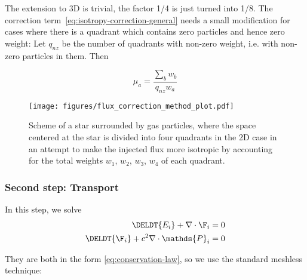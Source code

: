 The extension to 3D is trivial, the factor 1/4 is just turned into 1/8. The
correction term~\ref{eq:isotropy-correction-general} needs a small modification
for cases where there is a quadrant which contains zero particles and hence
zero weight: Let $q_{nz}$ be the number of quadrants with non-zero weight, i.e.
with non-zero particles in them. Then

\begin{equation}
	\mu_a = \frac{\sum_b w_b}{q_{nz} w_a} \label{eq:isotropy-correction-with-zero}
\end{equation}


\begin{figure}
	\centering
	\texttt{[image: figures/flux\_correction\_method\_plot.pdf]}%
	\label{fig:flux-injection-correction-method}
	\caption{
		Scheme of a star surrounded by gas particles, where the space centered at the
        star is divided into four quadrants in the 2D case in an attempt to make the
        injected flux more isotropic by accounting for the total weights $w_1$, $w_2$,
        $w_3$, $w_4$ of each quadrant.
	}
\end{figure}
























\subsubsection{Second step: Transport}\label{chap:transport-step}

In this step, we solve
\begin{align}
		\DELDT{E_i} + \nabla \cdot \F_i &= 0 \label{eq:homogenized-dEdt}\\
		\DELDT{\F_i} + c^2 \nabla \cdot \mathds{P}_i &= 0 \label{eq:homogenized-dFdt}
\end{align}

They are both in the form \ref{eq:conservation-law}, so we use the standard meshless technique:

